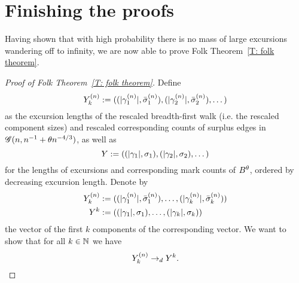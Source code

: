 \section{Finishing the proofs}
Having shown that with high probability there is no mass of large excursions wandering off to infinity,
we are now able to prove Folk Theorem~\ref{T: folk theorem}.

\begin{proof}[Proof of Folk Theorem~\ref{T: folk theorem}]
	Define
	\begin{equation} \label{E: def Yn}
		{Y}^{(n)}_k := ((|\gamma^{(n)}_1|, \bar{\sigma}^{(n)}_1), (|\gamma^{(n)}_2|, \bar{\sigma}^{(n)}_2), \dots)
	\end{equation}
	as the excursion lengths of the rescaled breadth-first walk (i.e. the rescaled component sizes) 
	and rescaled corresponding counts of surplus edges in $\mathscr{G}(n, n^{-1} + \theta n^{-4/3})$,
	as well as
	\begin{equation} \label{E: def Y}
		{Y} := ((|\gamma_1|, \sigma_1), (|\gamma_2|, \sigma_2), \dots)
	\end{equation}
	for the lengths of excursions and corresponding mark counts of $B^{\theta}$, ordered by decreasing excursion length.
	Denote by 
	\begin{equation}
		\begin{aligned}
		{Y}^{(n)}_k &:= ((|\gamma^{(n)}_1|, \bar{\sigma}^{(n)}_1), \dots, (|\gamma^{(n)}_k|, \bar{\sigma}^{(n)}_k)) \\
		{Y}^k  &:= ((|\gamma_1|, \sigma_1), \dots, (|\gamma_k|, \sigma_k))
		\end{aligned}
	\end{equation}
	the vector of the first $k$ components of the corresponding vector.
	We want to show that for all $k \in \mathbb{N}$ we have
	\begin{equation}
		{Y}^{(n)}_k \rightarrow_d {Y}^k.
	\end{equation}
	

\end{proof}
